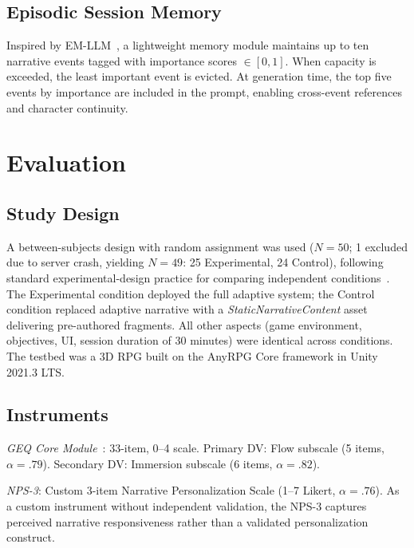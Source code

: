 \documentclass[conference]{IEEEtran}
\begin{document}
\subsection{Episodic Session Memory}

Inspired by EM-LLM~\cite{fountas2024episodic}, a lightweight memory module maintains up to ten narrative events tagged with importance scores $\in [0,1]$. When capacity is exceeded, the least important event is evicted. At generation time, the top five events by importance are included in the prompt, enabling cross-event references and character continuity.

\section{Evaluation}

\subsection{Study Design}

A between-subjects design with random assignment was used ($N = 50$; 1 excluded due to server crash, yielding $N = 49$: 25 Experimental, 24 Control), following standard experimental-design practice for comparing independent conditions~\cite{shadish2002experimental}. The Experimental condition deployed the full adaptive system; the Control condition replaced adaptive narrative with a \textit{StaticNarrativeContent} asset delivering pre-authored fragments. All other aspects (game environment, objectives, UI, session duration of 30 minutes) were identical across conditions. The testbed was a 3D RPG built on the AnyRPG Core framework in Unity 2021.3 LTS.

\subsection{Instruments}

\textit{GEQ Core Module}~\cite{ijsselsteijn2013geq}: 33-item, 0--4 scale. Primary DV: Flow subscale (5 items, $\alpha = .79$). Secondary DV: Immersion subscale (6 items, $\alpha = .82$).

\textit{NPS-3}: Custom 3-item Narrative Personalization Scale (1--7 Likert, $\alpha = .76$). As a custom instrument without independent validation, the NPS-3 captures perceived narrative responsiveness rather than a validated personalization construct.
\end{document}
